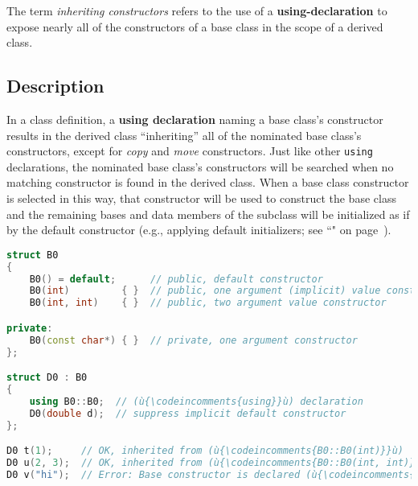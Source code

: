 
\label{inheriting-constructors}
\setcounter{table}{0}
\setcounter{footnote}{0}
\setcounter{lstlisting}{0}



The term \textit{inheriting constructors} refers to the use of a
\textbf{{\ttfamily\bfseries using}-declaration} to expose nearly all of the
constructors of a base class in the scope of a derived class.

\subsection[Description]{Description}\label{description-inheritingctor}

In a class definition, a \textbf{{\ttfamily\bfseries using} declaration} naming a
base class's constructor results in the derived class ``inheriting'' all
of the nominated base class's constructors, except for \emph{copy} and
\emph{move} constructors. Just like other \texttt{using} declarations, the nominated base class's
constructors will be searched when no matching constructor is found in
the derived class. When a base class constructor is selected in this way,
that constructor will be used to construct the base class and the
remaining bases and data members of the subclass will be initialized as
if by the default constructor (e.g., applying default initializers;
see ``" on page~\pageref{Default-Member-Initializers}).

\begin{lstlisting}[language=C++]
struct B0
{
    B0() = default;      // public, default constructor
    B0(int)         { }  // public, one argument (implicit) value constructor
    B0(int, int)    { }  // public, two argument value constructor

private:
    B0(const char*) { }  // private, one argument constructor
};

struct D0 : B0
{
    using B0::B0;  // (ù{\codeincomments{using}}ù) declaration
    D0(double d);  // suppress implicit default constructor
};

D0 t(1);     // OK, inherited from (ù{\codeincomments{B0::B0(int)}}ù)
D0 u(2, 3);  // OK, inherited from (ù{\codeincomments{B0::B0(int, int)}}ù)
D0 v("hi");  // Error: Base constructor is declared (ù{\codeincomments{private}}ù).
\end{lstlisting}

